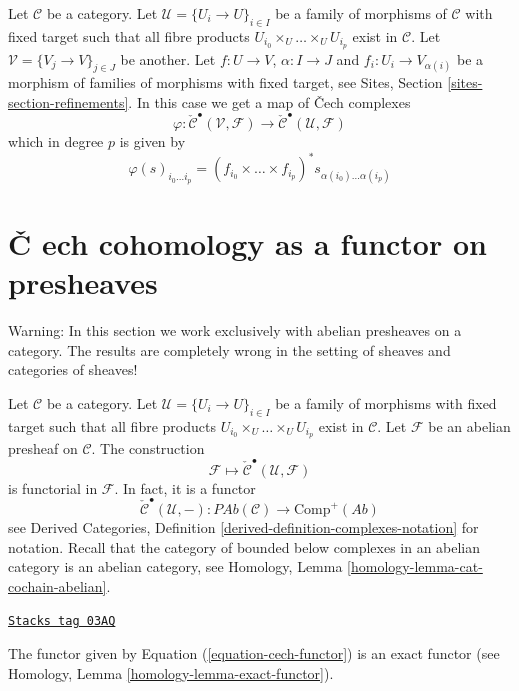 Let $\mathcal{C}$ be a category. Let $\mathcal{U} = \{U_i \to U\}_{i\in I}$
be a family of morphisms of $\mathcal{C}$ with fixed target such that
all fibre products $U_{i_0} \times_U \ldots \times_U U_{i_p}$ exist in
$\mathcal{C}$. Let $\mathcal{V} = \{V_j \to V\}_{j\in J}$ be another.
Let $f : U \to V$, $\alpha : I \to J$ and $f_i : U_i \to V_{\alpha(i)}$
be a morphism of families of morphisms with fixed target, see
Sites, Section \ref{sites-section-refinements}.
In this case we get a map of {\v C}ech complexes
\begin{equation}
\label{equation-map-cech-complexes}
\varphi : \check{\mathcal{C}}^\bullet(\mathcal{V}, \mathcal{F})
\longrightarrow
\check{\mathcal{C}}^\bullet(\mathcal{U}, \mathcal{F})
\end{equation}
which in degree $p$ is given by
$$
\varphi(s)_{i_0 \ldots i_p} =
(f_{i_0} \times \ldots \times f_{i_p})^*s_{\alpha(i_0) \ldots \alpha(i_p)}
$$

\section{{\v C}
ech cohomology as a functor on presheaves}
\label{sites-cohomology-section-cech-functor}

Warning: In this section we work exclusively with abelian presheaves
on a category. The results are completely wrong in the
setting of sheaves and categories of sheaves!

\medskip\noindent
Let $\mathcal{C}$ be a category. Let $\mathcal{U} = \{U_i \to U\}_{i \in I}$
be a family of morphisms with fixed target such that all fibre products
$U_{i_0} \times_U \ldots \times_U U_{i_p}$ exist in $\mathcal{C}$.
Let $\mathcal{F}$ be an abelian presheaf on $\mathcal{C}$.
The construction
$$
\mathcal{F} \longmapsto \check{\mathcal{C}}^\bullet(\mathcal{U}, \mathcal{F})
$$
is functorial in $\mathcal{F}$. In fact, it is a functor
\begin{equation}
\label{equation-cech-functor}
\check{\mathcal{C}}^\bullet(\mathcal{U}, -) :
\textit{PAb}(\mathcal{C})
\longrightarrow
\text{Comp}^{+}(\textit{Ab})
\end{equation}
see
Derived Categories, Definition \ref{derived-definition-complexes-notation}
for notation. Recall that the category of bounded below complexes
in an abelian category is an abelian category, see
Homology, Lemma \ref{homology-lemma-cat-cochain-abelian}.

\begin{lemma}
\label{sites-cohomology-lemma-cech-exact-presheaves}
\href{https://stacks.math.columbia.edu/tag/03AQ}{\texttt{Stacks tag 03AQ}}

The functor given by Equation (\ref{equation-cech-functor})
is an exact functor (see Homology, Lemma \ref{homology-lemma-exact-functor}).
\end{lemma}

